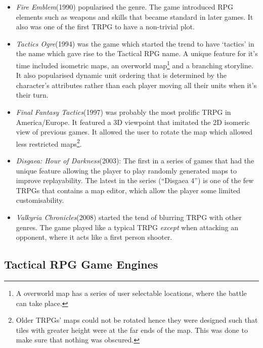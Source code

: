 \begin{itemize}
	
	\item \emph{Fire Emblem}(1990) popularised the genre. The game introduced RPG elements such as weapons and skills that became standard in later games. It also was one of the first TRPG to have a non-trivial plot. 

	\item \emph{Tactics Ogre}(1994) was the game which started the trend to have `tactics' in the name  which gave rise to the Tactical RPG name\footnotemark[\value{footnote}]\cite{tactics}. A unique feature for it's time included isometric maps, an overworld map\footnote{A overworld map has a series of user selectable locations, where the battle can take place.} and  a branching storyline. It also popularised dynamic unit ordering that is determined by the character's attributes rather than each player moving all their units when it's their turn.

	\item \emph{Final Fantasy Tactics}(1997) was probably the most prolific TRPG in America/Europe. It featured a 3D viewpoint that imitated  the 2D isomeric view of previous games.  It allowed the user to rotate the map which allowed less restricted maps\footnote{Older TRPGs' maps could not be rotated hence they were designed such that tiles with greater height were at the far ends of the map. This was done to make sure that nothing was obscured.}.
	
	\item  \emph{Disgaea: Hour of Darkness}(2003): The first in a series of games that had the unique feature allowing the player to play randomly generated maps to improve replayability. The latest in the series (``Disgaea 4'') is one of the few TRPGs that contains a map editor, which allow the player some limited customisability. 


	\item  \emph{Valkyria Chronicles}(2008) started the tend of blurring TRPG with other genres. The game played like a typical TRPG \emph{except} when attacking an opponent, where it acts like a first person shooter.

\end{itemize}


\subsection{Tactical RPG Game Engines}
\label{sub:tactical_rpg_game_engines}

